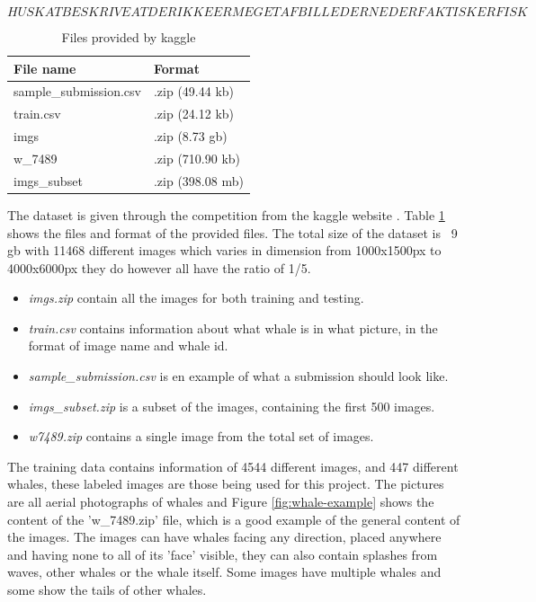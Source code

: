 \[HUSK AT BESKRIVE AT DER IKKE ER MEGET AF BILLEDERNE DER FAKTISK ER FISK\]
\begin{table}
	\centering
	\caption{Files provided by kaggle}
	\label{table:dataset-files}
	\begin{tabular}{|l|l|}
		\hline
		File name              & Format           \\ \hline \hline
		sample\_submission.csv & .zip (49.44 kb)  \\ \hline
		train.csv              & .zip (24.12 kb)  \\ \hline
		imgs                   & .zip (8.73 gb)   \\ \hline
		w\_7489                & .zip (710.90 kb) \\ \hline
		imgs\_subset           & .zip (398.08 mb) \\ \hline
	\end{tabular}
\end{table}

The dataset is given through the competition from the kaggle website \cite{kaggle:competition}. Table \ref{table:dataset-files} shows the files and format of the provided files. The total size of the dataset is ~9 gb with 11468 different images which varies in dimension from 1000x1500px to 4000x6000px they do however all have the ratio of 1/5.

\begin{itemize}
	\item \emph{imgs.zip} contain all the images for both training and testing.
	\item \emph{train.csv} contains information about what whale is in what picture, in the format of image name and whale id.
	\item \emph{sample\_submission.csv} is en example of what a submission should look like.
	\item \emph{imgs\_subset.zip} is a subset of the images, containing the first 500 images.
	\item \emph{w\-7489.zip} contains a single image from the total set of images.
\end{itemize}

The training data contains information of 4544 different images, and 447 different whales, these labeled images are those being used for this project. The pictures are all aerial photographs of whales and Figure \ref{fig:whale-example} shows the content of the 'w\_7489.zip' file, which is a good example of the general content of the images. The images can have whales facing any direction, placed anywhere and having none to all of its 'face' visible, they can also contain splashes from waves, other whales or the whale itself. Some images have multiple whales and some show the tails of other whales.

